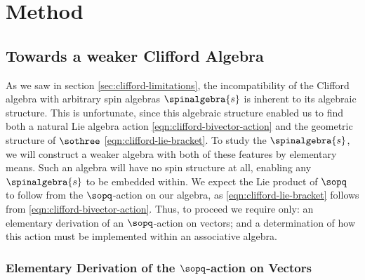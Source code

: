 \documentclass{article}
\begin{document}
\section{Method}\label{sec:method}

\subsection{Towards a weaker Clifford Algebra}

As we saw in section \ref{sec:clifford-limitations}, the incompatibility of the Clifford algebra with arbitrary spin algebras $\spinalgebra{s}$ is inherent to its algebraic structure. This is unfortunate, since this algebraic structure enabled us to find both a natural Lie algebra action \eqref{eqn:clifford-bivector-action} and the geometric structure of $\sothree$ \eqref{eqn:clifford-lie-bracket}. To study the $\spinalgebra{s}$, we will construct a weaker algebra with both of these features by elementary means. Such an algebra will have no spin structure at all, enabling any $\spinalgebra{s}$ to be embedded within. We expect the Lie product of $\sopq$ to follow from the $\sopq$-action on our algebra, as \eqref{eqn:clifford-lie-bracket} follows from \eqref{eqn:clifford-bivector-action}. Thus, to proceed we require only: an elementary derivation of an $\sopq$-action on vectors; and a determination of how this action must be implemented within an associative algebra.

\subsubsection{Elementary Derivation of the \texorpdfstring{$\sopq$}{so(p,q)}-action on Vectors}\label{sec:derivation-lie-action}
\end{document}
